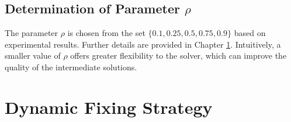 \subsection{Determination of Parameter $\rho$}
The parameter $\rho$ is chosen from the set $\{0.1, 0.25, 0.5, 0.75, 0.9\}$ based on experimental results. Further details are provided in Chapter \ref{}. Intuitively, a smaller value of $\rho$ offers greater flexibility to the solver, which can improve the quality of the intermediate solutions.  

\section{Dynamic Fixing Strategy}

